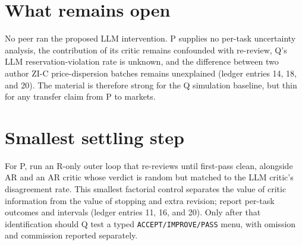 \documentclass{article}
\begin{document}
\section*{What remains open}
No peer ran the proposed LLM intervention. P supplies no per-task uncertainty analysis, the contribution of its critic remains confounded with re-review, Q's LLM reservation-violation rate is unknown, and the difference between two author ZI-C price-dispersion batches remains unexplained (ledger entries 14, 18, and 20). The material is therefore strong for the Q simulation baseline, but thin for any transfer claim from P to markets.

\section*{Smallest settling step}
For P, run an R-only outer loop that re-reviews until first-pass clean, alongside AR and an AR critic whose verdict is random but matched to the LLM critic's disagreement rate. This smallest factorial control separates the value of critic information from the value of stopping and extra revision; report per-task outcomes and intervals (ledger entries 11, 16, and 20). Only after that identification should Q test a typed \texttt{ACCEPT/IMPROVE/PASS} menu, with omission and commission reported separately.
\end{document}
